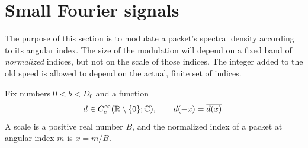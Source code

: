 \section{Small Fourier signals}
\label{sec:signals}

The purpose of this section is to modulate a packet's spectral density
according to its angular index.  The size of the modulation will depend on
a fixed band of \emph{normalized} indices, but not on the scale of those
indices.  The integer added to the old speed is allowed to depend on the
actual, finite set of indices.

Fix numbers $0<b<D_0$ and a function
\begin{equation}
 d\in C_c^\infty(\mathbb R\setminus\{0\};\mathbb C),
 \qquad d(-x)=\overline{d(x)}.
 \label{eq:signal-d}
\end{equation}
A scale is a positive real number $B$, and the normalized index of a
packet at angular index $m$ is $x=m/B$.

